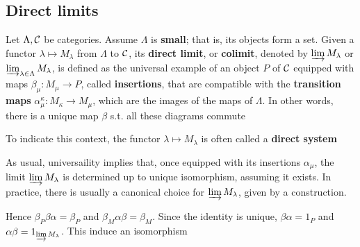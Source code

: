 \documentclass[11pt]{article}
\begin{document}
\subsection*{Direct limits \label{6.6}}
\label{sec:orgf0723c6}
Let \(\Lambda,\mathcal{C}\) be categories. Assume \(\Lambda\) is \textbf{small}; that is, its objects form a
set. Given a functor \(\lambda\mapsto M_{\lambda}\) from \(\Lambda\) to \(\mathcal{C}\), its
\textbf{direct limit}, or \textbf{colimit}, denoted by \(\varinjlim M_\lambda\) or
\(\varinjlim_{\lambda\in\Lambda}M_\lambda\), is defined as the universal
example of an object \(P\) of \(\mathcal{C}\) equipped with maps
\(\beta_\mu:M_\mu\to P\), called \textbf{insertions}, that are compatible with the
\textbf{transition maps} \(\alpha^\kappa_\mu:M_\kappa\to M_\mu\), which are the images of
the maps of \(\Lambda\).  In other words, there is a unique map \(\beta\) s.t. all these
diagrams commute
\begin{center}
\end{center}
To indicate this context, the functor \(\lambda\mapsto M_\lambda\) is often
called a \textbf{direct system}

As usual, universaility implies that, once equipped with its insertions
\(\alpha_\mu\), the limit \(\varinjlim M_\lambda\) is determined up to unique
isomorphism, assuming it exists. In practice, there is usually a canonical
choice for \(\varinjlim M_\lambda\), given by a construction.
\begin{center}
\end{center}
Hence \(\beta_P\beta\alpha=\beta_P\) and \(\beta_M\alpha\beta=\beta_M\).
Since the identity is unique, \(\beta\alpha=1_P\) and
\(\alpha\beta=1_{\varinjlim M_\lambda}\). This induce an isomorphism
\end{document}
